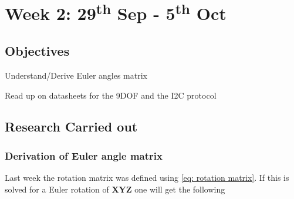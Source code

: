 

\chapter{Week 2: 29\textsuperscript{th} Sep - 5\textsuperscript{th} Oct}

\tocless\section{Objectives}

\begin{itemize*}
	\item Understand/Derive  Euler angles matrix
	\item Read up on datasheets for the 9DOF and the I2C protocol
\end{itemize*}

\tocless\section{Research Carried out}

\tocless\subsection{Derivation of Euler angle matrix}
Last week the rotation matrix was defined using \eqref{eq: rotation matrix}. If  this is solved for a Euler rotation of {\bf XYZ} one will get the following

